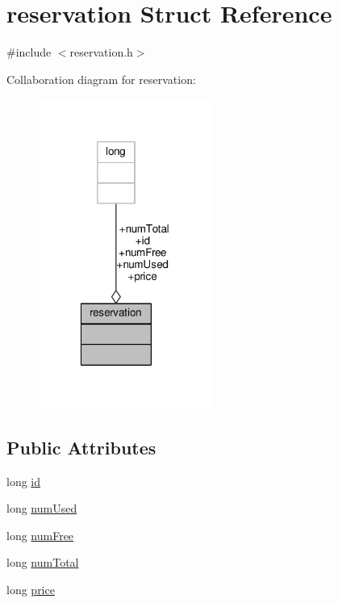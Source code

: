 \hypertarget{structreservation}{\section{reservation Struct Reference}
\label{structreservation}
}


{\ttfamily \#include $<$reservation.\-h$>$}



Collaboration diagram for reservation\-:
\nopagebreak
\begin{figure}[H]
\begin{center}
\leavevmode
\includegraphics[width=162pt]{structreservation__coll__graph}
\end{center}
\end{figure}
\subsection*{Public Attributes}
\begin{DoxyCompactItemize}
\item 
long \hyperlink{structreservation_ad4790977c3bbde533335fa811f30bf97}{id}
\item 
long \hyperlink{structreservation_ae7f3560526a70c99f4bc8ede4f053f97}{num\-Used}
\item 
long \hyperlink{structreservation_af3f8774160dcc8ba719203e540326a08}{num\-Free}
\item 
long \hyperlink{structreservation_a1757e5eaad0a54b113cc91c2a6ba0548}{num\-Total}
\item 
long \hyperlink{structreservation_a8dff1fcfa4c2607305130f8bce63b2a5}{price}
\end{DoxyCompactItemize}


